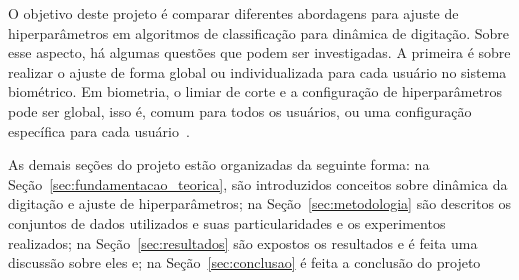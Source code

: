 O objetivo deste projeto é comparar diferentes abordagens para ajuste de hiperparâmetros em algoritmos de classificação para dinâmica de digitação. Sobre esse aspecto, há algumas questões que podem ser investigadas. A primeira é sobre realizar o ajuste de forma global ou individualizada para cada usuário no sistema biométrico. Em biometria, o limiar de corte e a configuração de hiperparâmetros pode ser global, isso é, comum para todos os usuários, ou uma configuração específica para cada usuário~\cite{Giot2011Unconstrained, Mhenni2019DoubleSerial}.

As demais seções do projeto estão organizadas da seguinte forma: na Seção~\ref{sec:fundamentacao_teorica}, são introduzidos conceitos sobre dinâmica da digitação e ajuste de hiperparâmetros; na Seção~\ref{sec:metodologia} são descritos os conjuntos de dados utilizados e suas particularidades e os experimentos realizados; na Seção~\ref{sec:resultados} são expostos os resultados e é feita uma discussão sobre eles e; na Seção~\ref{sec:conclusao} é feita a conclusão do projeto

